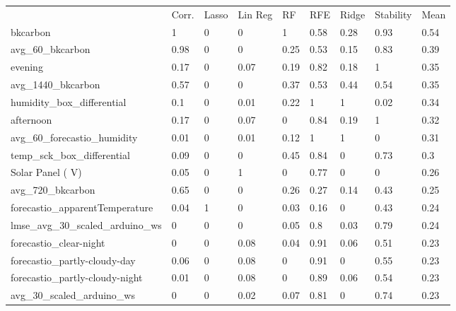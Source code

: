 \begin{table}[]
\centering
\small
\begin{tabular}{lllllllll}
\\
\\
\toprule
     & Corr. & Lasso & Lin Reg & RF   & RFE  & Ridge & Stability & Mean \\
\midrule
bkcarbon                            & 1     & 0          & 0    & 1    & 0.58  & 0.28      & 0.93 & 0.54 \\
avg\_60\_bkcarbon                   & 0.98  & 0          & 0    & 0.25 & 0.53  & 0.15      & 0.83 & 0.39 \\
evening                             & 0.17  & 0          & 0.07 & 0.19 & 0.82  & 0.18      & 1    & 0.35 \\
avg\_1440\_bkcarbon                 & 0.57  & 0          & 0    & 0.37 & 0.53  & 0.44      & 0.54 & 0.35 \\
humidity\_box\_differential         & 0.1   & 0          & 0.01 & 0.22 & 1     & 1         & 0.02 & 0.34 \\
afternoon                           & 0.17  & 0          & 0.07 & 0    & 0.84  & 0.19      & 1    & 0.32 \\
avg\_60\_forecastio\_humidity       & 0.01  & 0          & 0.01 & 0.12 & 1     & 1         & 0    & 0.31 \\
temp\_sck\_box\_differential        & 0.09  & 0          & 0    & 0.45 & 0.84  & 0         & 0.73 & 0.3  \\
Solar Panel ( V)                    & 0.05  & 0          & 1    & 0    & 0.77  & 0         & 0    & 0.26 \\
avg\_720\_bkcarbon                  & 0.65  & 0          & 0    & 0.26 & 0.27  & 0.14      & 0.43 & 0.25 \\
forecastio\_apparentTemperature     & 0.04  & 1          & 0    & 0.03 & 0.16  & 0         & 0.43 & 0.24 \\
lmse\_avg\_30\_scaled\_arduino\_ws  & 0     & 0          & 0    & 0.05 & 0.8   & 0.03      & 0.79 & 0.24 \\
forecastio\_clear-night             & 0     & 0          & 0.08 & 0.04 & 0.91  & 0.06      & 0.51 & 0.23 \\
forecastio\_partly-cloudy-day       & 0.06  & 0          & 0.08 & 0    & 0.91  & 0         & 0.55 & 0.23 \\
forecastio\_partly-cloudy-night     & 0.01  & 0          & 0.08 & 0    & 0.89  & 0.06      & 0.54 & 0.23 \\
avg\_30\_scaled\_arduino\_ws        & 0     & 0          & 0.02 & 0.07 & 0.81  & 0         & 0.74 & 0.23 \\

\end{tabular}
\end{table}
